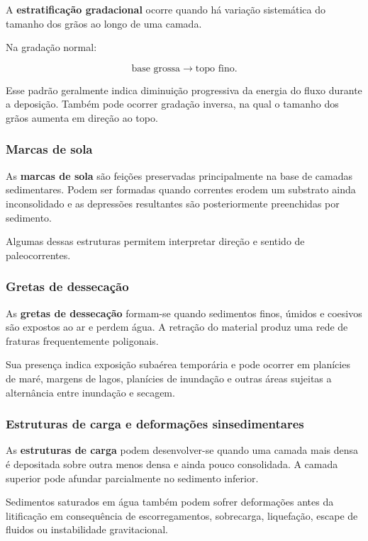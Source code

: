 A \textbf{estratificação gradacional} ocorre quando há variação sistemática do
tamanho dos grãos ao longo de uma camada.

Na gradação normal:

\[
\text{base grossa}
\rightarrow
\text{topo fino}.
\]

Esse padrão geralmente indica diminuição progressiva da energia do fluxo durante
a deposição. Também pode ocorrer gradação inversa, na qual o tamanho dos grãos
aumenta em direção ao topo.

\subsubsection{Marcas de sola}

As \textbf{marcas de sola} são feições preservadas principalmente na base de
camadas sedimentares. Podem ser formadas quando correntes erodem um substrato
ainda inconsolidado e as depressões resultantes são posteriormente preenchidas
por sedimento.

Algumas dessas estruturas permitem interpretar direção e sentido de
paleocorrentes.

\subsubsection{Gretas de dessecação}

As \textbf{gretas de dessecação} formam-se quando sedimentos finos, úmidos e
coesivos são expostos ao ar e perdem água. A retração do material produz uma rede
de fraturas frequentemente poligonais.

Sua presença indica exposição subaérea temporária e pode ocorrer em planícies de
maré, margens de lagos, planícies de inundação e outras áreas sujeitas a
alternância entre inundação e secagem.

\subsubsection{Estruturas de carga e deformações sinsedimentares}

As \textbf{estruturas de carga} podem desenvolver-se quando uma camada mais densa
é depositada sobre outra menos densa e ainda pouco consolidada. A camada
superior pode afundar parcialmente no sedimento inferior.

Sedimentos saturados em água também podem sofrer deformações antes da
litificação em consequência de escorregamentos, sobrecarga, liquefação, escape
de fluidos ou instabilidade gravitacional.


